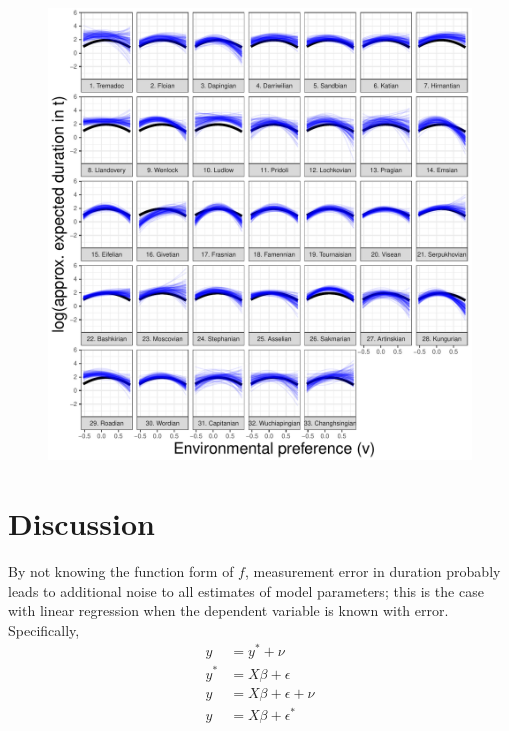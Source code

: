 \documentclass{article}
\begin{document}
\begin{figure}[ht]
  \centering
  \includegraphics[width = \textwidth,height = \textheight,keepaspectratio=true]{figure/env_cohort}
  \caption{}
  \label{fig:env_cohort}
\end{figure}




\section{Discussion}



By not knowing the function form of \(f\), measurement error in duration probably leads to additional noise to all estimates of model parameters; this is the case with linear regression when the dependent variable is known with error. Specifically, 
\begin{equation}
  \begin{aligned}
    y &= y^{*} + \nu \\
    y^{*} &= X\beta + \epsilon \\
    y &= X\beta + \epsilon + \nu \\
    y &= X\beta + \epsilon^{*} \\
  \end{aligned}
\end{equation}
\end{document}
